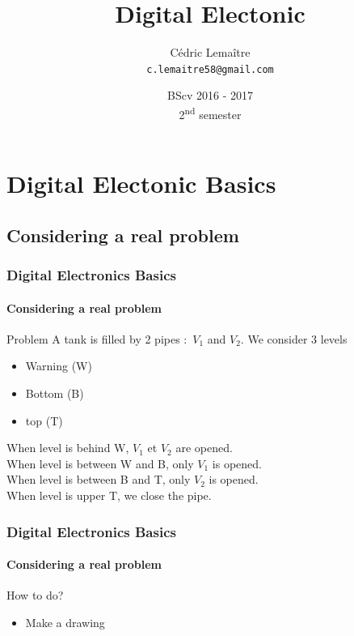 \documentclass{beamer}
\title{Digital Electonic}
\author{Cédric Lemaître \\ \texttt{c.lemaitre58@gmail.com}}
\date{BScv 2016 - 2017 \\ 2\textsuperscript{nd} semester}
\institute{Universit\'e de Bourgogne}
\begin{document}
\begin{frame}
  \titlepage
\end{frame}

\begin{frame}
  \tableofcontents[sectionstyle=show,subsectionstyle=show,subsubsectionstyle=hide]
\end{frame}

\section{Digital Electonic Basics}

\subsection{Considering a real problem}

\begin{frame}
  \frametitle{Digital Electronics Basics}
  \framesubtitle{Considering a real problem}
  \begin{block}{Problem}
	  A tank is filled by 2 pipes : $V_1$ and $V_2$.
	  We consider 3 levels
    \begin{itemize}
	\item Warning (W)
	\item Bottom (B)
	\item top (T)
    \end{itemize}
    When level is behind W, $V_1$ et $V_2$ are opened.\\
    When level is between W and B, only $V_1$ is opened.\\
    When level is between B and T, only $V_2$ is opened.\\
    When level is upper T, we close the pipe.
  \end{block}

\end{frame}

\begin{frame}
  \frametitle{Digital Electronics Basics}
  \framesubtitle{Considering a real problem}
  \begin{block}{How to do?}
	  \begin{itemize}
		  \item Make a drawing
	  \end{itemize}
\end{block}
\end{frame}
\end{document}
